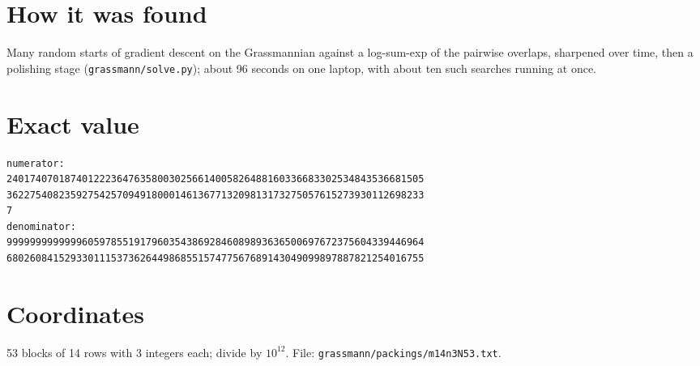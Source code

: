 \documentclass[11pt,a4paper]{article}
\begin{document}
\section{How it was found}
Many random starts of gradient descent on the Grassmannian against a log-sum-exp of the pairwise overlaps, sharpened over time, then a polishing stage (\texttt{grassmann/solve.py}); about 96 seconds on one laptop, with about ten such searches running at once.


\appendix
\section{Exact value}
{\small
\begin{verbatim}
numerator:
240174070187401222364763580030256614005826488160336683302534843536681505
362275408235927542570949180001461367713209813173275057615273930112698233
7
denominator:
999999999999960597855191796035438692846089893636500697672375604339446964
680260841529330111537362644986855157477567689143049099897887821254016755
\end{verbatim}}

\section{Coordinates}
53 blocks of 14 rows with 3 integers each; divide by $10^{12}$. File: \texttt{grassmann/packings/m14n3N53.txt}.
{\tiny
\begin{multicols}{3}
\end{multicols}}
\end{document}
